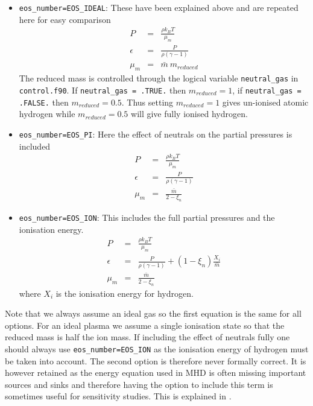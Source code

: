 \documentclass[11pt]{article}
\begin{document}
\begin{itemize}
\item \texttt{eos\_number=EOS\_IDEAL}: These have been explained above and are repeated here for easy comparison
\begin{eqnarray*}
P&=&\frac{\rho k_{B}T}{\mu_m}\\
\epsilon&=&\frac{P}{\rho(\gamma-1)}\\
\mu_m&=&\bar{m}\ m_{reduced}
\end{eqnarray*}
The reduced mass is controlled through the logical variable {\tt neutral\_gas} in  \texttt{control.f90}. If
{\tt neutral\_gas = .TRUE.} then $m_{reduced}=1$, if {\tt neutral\_gas = .FALSE.} then $m_{reduced}=0.5$.
Thus setting $m_{reduced}=1$ gives un-ionised atomic hydrogen while $m_{reduced}=0.5$ will give fully ionised hydrogen.

\item \texttt{eos\_number=EOS\_PI}: Here the effect of neutrals on the partial pressures is included
\begin{eqnarray*}
P&=&\frac{\rho k_{B}T}{\mu_m}\\
\epsilon&=&\frac{P}{\rho(\gamma-1)}\\
\mu_m&=&\frac{\bar{m}}{2-\xi_n}
\end{eqnarray*}

\item \texttt{eos\_number=EOS\_ION}: This includes the full partial pressures and the ionisation energy.
\begin{eqnarray*}
P&=&\frac{\rho k_{B}T}{\mu_m}\\
\epsilon&=&\frac{P}{\rho(\gamma-1)}+(1-\xi_n)\frac{X_i}{\bar{m}}\\
\mu_m&=&\frac{\bar{m}}{2-\xi_n}
\end{eqnarray*}
where $X_i$ is the ionisation energy for hydrogen.

\end{itemize}

Note that we always assume an ideal gas so the first equation is the same for all options. For an ideal plasma we assume a single ionisation state so that the reduced mass is half the ion mass. If including the effect of neutrals fully one should always use \texttt{eos\_number=EOS\_ION} as the ionisation energy of hydrogen must be taken into account. The second option is therefore never formally correct. It is however retained as the energy equation used in MHD is often missing important sources and sinks and therefore having the option to include this term is sometimes useful for sensitivity studies. This is explained in \cite{flux-emergence}.
\end{document}
